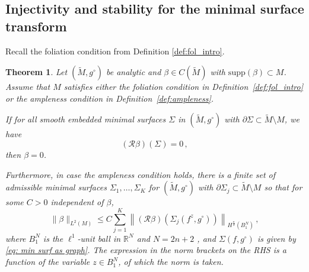 \documentclass[11pt]{amsart}
\newtheorem{Theorem}{Theorem}[section]
\theoremstyle{definition}
\numberwithin{equation}{section}
\newcommand{\mR}{\mathbb{R}}                    %
\newcommand{\norm}[1]{\lVert #1 \rVert}         %
\newcommand{\supp}{\mathrm{supp}}
\newcommand{\p}{\partial}
\begin{document}
\subsection{Injectivity and stability for the minimal surface transform}\label{sec:foliation_inj}


Recall the foliation condition from Definition \ref{def:fol_intro}.







\begin{Theorem}\label{thm:weakfol}
    	Let $(\widetilde{M},g^\circ)$ be analytic and $\beta \in C(\widetilde{M})$ with $\supp(\beta)\subset M$. Assume that $M$ satisfies either the foliation condition in Definition~\ref{def:fol_intro} or the  ampleness condition in Definition~\ref{def:ampleness}.
    
    If for all smooth embedded minimal surfaces $\Sigma$ in $(\widetilde{M},g^\circ)$ with $\p\Sigma\subset \widetilde{M}\setminus M$, we have
	\begin{equation}\label{eq:full02}
		(\mathcal{R}\beta)(\Sigma)=0\,,%
	\end{equation}
	then $\beta = 0$.

    Furthermore, in case the ampleness condition holds, there is a finite set of admissible minimal surfaces $\Sigma_1,\dots,\Sigma_K$ for $(\widetilde{M},g^\circ)$ with $\p\Sigma_j\subset \widetilde{M}\setminus M$ so that for some $C>0$ independent of $\beta$,
    \begin{equation}\label{eq:normboundlinearized2}
        \norm{\beta}_{L^2(M)} \leq C\sum_{j=1}^K \left\lVert (\mathcal{R}\beta)(\Sigma_j(f^z,g^\circ))\right\rVert_{H^{\frac{n}{2}}(B_{1}^{N})}\,,
    \end{equation}
    where $B_{1}^{N}$ is the $\ell^1$-unit ball in $\mR^{N}$ and $N=2n+2$%
    , and $\Sigma(f, g^\circ)$ is given by \eqref{eq: min surf as graph}. The expression in the norm brackets on the RHS is a function of the variable $z\in B_1^{N}$, of which the norm is taken.
\end{Theorem}
\end{document}
